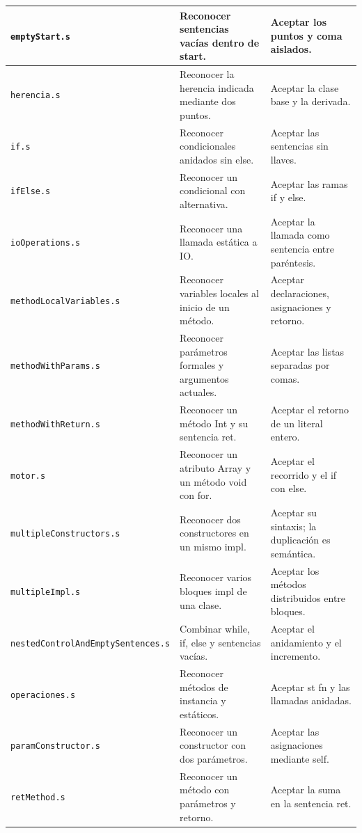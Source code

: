 \begin{longtable}{|
>{\raggedright\arraybackslash}p{}|
>{\raggedright\arraybackslash}p{}|
>{\raggedright\arraybackslash}p{}|}
\texttt{emptyStart\allowbreak .s} & Reconocer sentencias vacías dentro de start. & Aceptar los puntos y coma aislados. \\ \hline
\texttt{herencia\allowbreak .s} & Reconocer la herencia indicada mediante dos puntos. & Aceptar la clase base y la derivada. \\ \hline
\texttt{if\allowbreak .s} & Reconocer condicionales anidados sin else. & Aceptar las sentencias sin llaves. \\ \hline
\texttt{ifElse\allowbreak .s} & Reconocer un condicional con alternativa. & Aceptar las ramas if y else. \\ \hline
\texttt{ioOperations\allowbreak .s} & Reconocer una llamada estática a IO. & Aceptar la llamada como sentencia entre paréntesis. \\ \hline
\texttt{methodLocalVariables\allowbreak .s} & Reconocer variables locales al inicio de un método. & Aceptar declaraciones, asignaciones y retorno. \\ \hline
\texttt{methodWithParams\allowbreak .s} & Reconocer parámetros formales y argumentos actuales. & Aceptar las listas separadas por comas. \\ \hline
\texttt{methodWithReturn\allowbreak .s} & Reconocer un método Int y su sentencia ret. & Aceptar el retorno de un literal entero. \\ \hline
\texttt{motor\allowbreak .s} & Reconocer un atributo Array y un método void con for. & Aceptar el recorrido y el if con else. \\ \hline
\texttt{multipleConstructors\allowbreak .s} & Reconocer dos constructores en un mismo impl. & Aceptar su sintaxis; la duplicación es semántica. \\ \hline
\texttt{multipleImpl\allowbreak .s} & Reconocer varios bloques impl de una clase. & Aceptar los métodos distribuidos entre bloques. \\ \hline
\texttt{nestedControlAndEmptySentences\allowbreak .s} & Combinar while, if, else y sentencias vacías. & Aceptar el anidamiento y el incremento. \\ \hline
\texttt{operaciones\allowbreak .s} & Reconocer métodos de instancia y estáticos. & Aceptar st fn y las llamadas anidadas. \\ \hline
\texttt{paramConstructor\allowbreak .s} & Reconocer un constructor con dos parámetros. & Aceptar las asignaciones mediante self. \\ \hline
\texttt{retMethod\allowbreak .s} & Reconocer un método con parámetros y retorno. & Aceptar la suma en la sentencia ret. \\ \hline

\end{longtable}
